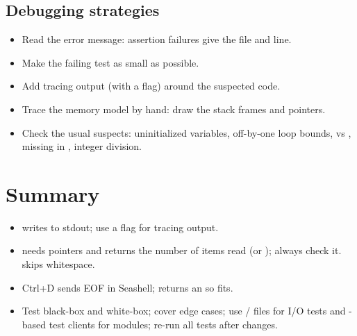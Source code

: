 \subsection{Debugging strategies}
\begin{itemize}
  \item Read the error message: assertion failures give the file and line.
  \item Make the failing test as small as possible.
  \item Add tracing output (with a  flag) around the suspected code.
  \item Trace the memory model by hand: draw the stack frames and pointers.
  \item Check the usual suspects: uninitialized variables, off-by-one loop bounds, \code{=} vs
    \code{==}, missing \code{\&} in , integer division.
\end{itemize}

\section{Summary}
\begin{itemize}
  \item {} writes to stdout; use a  flag for tracing output.
  \item {} needs pointers and returns the number of items read (or ); always
    check it.  skips whitespace.
  \item Ctrl+D sends EOF in Seashell;  returns an  so  fits.
  \item Test black-box and white-box; cover edge cases; use / files for
    I/O tests and -based test clients for modules; re-run all tests after changes.
\end{itemize}
